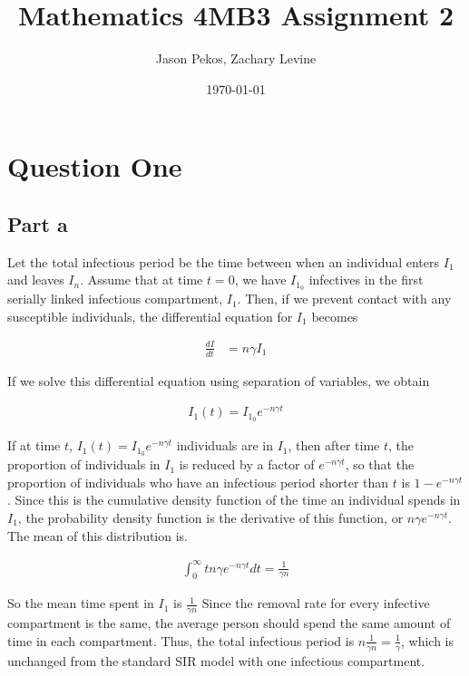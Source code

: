 \documentclass[12pt]{article}
\begin{document}
\linenumbers

\title{Mathematics 4MB3 Assignment 2}
\author{Jason Pekos, Zachary Levine}
\date{\today}
\maketitle

\section*{Question One}

\subsection*{Part a}
Let the total infectious period be the time between when an individual enters $I_1$ and leaves $I_n$. Assume that at time $t = 0$, we have $I_{1_0}$ infectives in the first serially linked infectious compartment, $I_1$. Then, if we prevent contact with any susceptible individuals, the differential equation for $I_1$ becomes
\begin{linenomath}
\begin{align*}
\frac{dI}{dt} &= n \gamma I_1
\end{align*}
\end{linenomath}

If we solve this differential equation using separation of variables, we obtain
\begin{linenomath}
\begin{align*}
I_1(t) = I_{1_0} e ^{-n\gamma t}
\end{align*}
\end{linenomath}

If at time $t$, $I_1(t) = I_{1_0} e^{-n\gamma t}$ individuals are in $I_1$, then after time $t$, the proportion of individuals in $I_1$ is reduced by a factor of $e^{-n\gamma t}$, so that the proportion of individuals who have an infectious period shorter than $t$ is $1-e^{-n\gamma t}$. Since this is the cumulative density function of the time an individual spends in $I_1$, the probability density function is the derivative of this function, or $n\gamma e^{-n\gamma t}$. The mean of this distribution is.

\begin{linenomath}
\begin{align*}
\int_{0}^{\infty} t n\gamma e^{-n\gamma t} dt = \frac{1}{\gamma n}
 \end{align*}
\end{linenomath}

So the mean time spent in $I_1$ is $\frac{1}{\gamma n}$ Since the removal rate for every infective compartment is the same, the average person should spend the same amount of time in each compartment. Thus, the total infectious period is $n \frac{1}{\gamma n} = \frac{1}{\gamma}$, which is unchanged from the standard SIR model with one infectious compartment.
\end{document}
